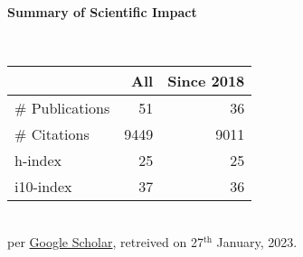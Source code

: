 \headedsection %
{\bf Summary of Scientific Impact}{}{}
{
    \qquad~~~~
    \begin{minipage}[t]{0.6\textwidth}
        \begin{tabular}{lrr}
        \hline
         & All & Since 2018\\
        \hline
        \# Publications & 51    & 36    \\
        \# Citations    & 9449  & 9011  \\
        h-index         & 25    & 25    \\
        i10-index       & 37    & 36    \\
        \hline
    \end{tabular}
    \\
    {\footnotesize{
        per \href{https://scholar.google.com/citations?user=wpLQuroAAAAJ}{Google Scholar},
        retreived on 27$^\text{th}$ January, 2023.
        }
    }
    \end{minipage}
     
}
